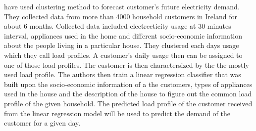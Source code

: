 \cite{mcloughlin2015clustering} have used clustering method to forecast customer's future electricity demand. They collected data from more than 4000 household customers in Ireland for about 6 months. Collected data included electrecticity usage at 30 minutes interval, appliances used in the home and different socio-economic information about the people living in a particular house. They clustered each days usage which they call load profiles. A customer's daily usage then can be assigned to one of those load profiles. The customer is then charactersized by the the mostly used load profile. The authors then train a linear regression classifier that was built upon the socio-economic information of a the customers, types of appliances used in the house and the description of the house to figure out the common load profile of the given household. The predicted load profile of the customer received from the linear regression model will be used to predict the demand of the customer for a given day.
 

